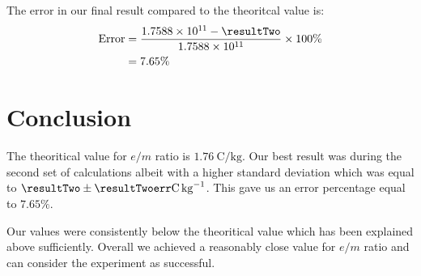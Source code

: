 \documentclass[../main.tex]{subfiles}
\begin{document}
The error in our final result compared to the theoritcal value is:
\begin{align*}
	\textrm{Error} &= \frac{\num{1.7588e11} - \resultTwo}{\num{1.7588e11}} \times 100\% \\ 
		       &= 7.65\%
\end{align*}

\section{Conclusion}
The theoritical value for $e/m$ ratio is $\SI{1.76}{\coulomb\per\kilogram}$. 
Our best result was during the second set of calculations albeit with a higher standard deviation which was equal to $\resultTwo \pm \resultTwoerr \si{\coulomb\per\kilogram}$.
This gave us an error percentage equal to $7.65\%$.

Our values were consistently below the theoritical value which has been explained above sufficiently.
Overall we achieved a reasonably close value for $e/m$ ratio and can consider the experiment as successful.
\end{document}
